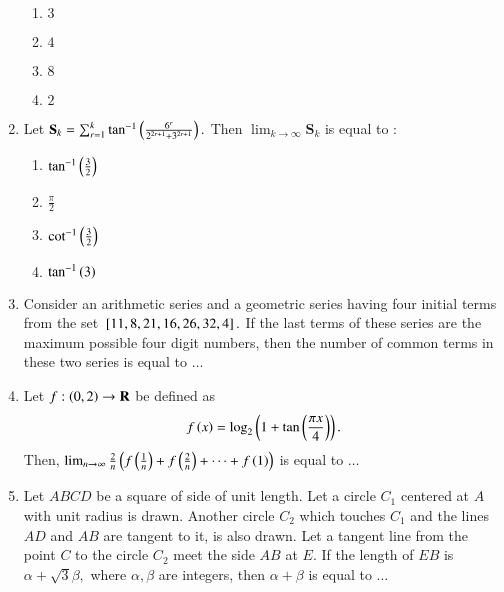 \documentclass[journal,12pt,twocolumn]{IEEEtran}
\theoremstyle{remark}
\begin{document}
\begin{enumerate}[start=16]
    \begin{enumerate}
        \item $3$
        \item $4$
        \item $8$
        \item $2$
    \end{enumerate}
    \item Let $\textbf{S}_k=\sum_{r=1}^k\tan^{-1}\left(\frac{6^r}{2^{2r+1}+3^{2r+1}}\right).$ Then $\lim_{k \to \infty}\textbf{S}_k$ is equal to $:$\\
    \begin{enumerate}
        \item $\tan^{-1}\left(\frac{3}{2}\right)$
        \item $\frac{\pi}{2}$
        \item $\cot^{-1}\left(\frac{3}{2}\right)$
        \item $\tan^{-1}\left(3\right)$
    \end{enumerate}
    \item Consider an arithmetic series and a geometric series having four initial terms from the set ${}\left[11,8,21,16,26,32,4\right].$ If the last terms of these series are the maximum possible four digit numbers, then the number of common terms in these two series is equal to $\dots$\\
    \item Let $f :\left(0,2\right) \to \textbf{R}$ be defined as $$f\left(x\right)=\log_2\left(1+\tan\left(\frac{\pi x}{4}\right)\right).$$ Then, $\lim_{n \to \infty}\frac{2}{n}\left(f\left(\frac{1}{n}\right)+f\left(\frac{2}{n}\right)+ \dots +f\left(1\right)\right)$ is equal to $\dots$\\
    \item Let $ABCD$ be a square of side of unit length. Let a circle $C_{1}$ centered at $A$ with unit radius is drawn. Another circle $C_{2}$ which touches $C_{1}$ and the lines $AD$ and $AB$ are tangent to it, is also drawn. Let a tangent line from the point $C$ to the circle $C_{2}$ meet the side $AB$ at $E$. If the length of $EB$ is $\alpha + \sqrt{3}\beta ,$ where $\alpha,\beta$ are integers, then $\alpha +\beta$ is equal to $\dots$\\


\end{enumerate}
\end{document}
